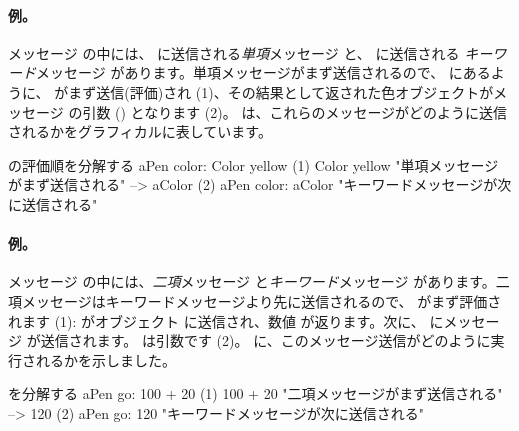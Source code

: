 \documentclass[a4paper,10pt,twoside]{book}
\begin{document}


\paragraph{例。}
メッセージ  の中には、 に送信される\emph{単項}メッセージ と、 に送信される \emph{キーワード}メッセージ  があります。単項メッセージがまず送信されるので、 にあるように、 がまず送信(評価)され (1)、その結果として返された色オブジェクトがメッセージ  の引数 () となります (2)。
 は、これらのメッセージがどのように送信されるかをグラフィカルに表しています。

\begin{example}[decColor]{ の評価順を分解する}{}
        aPen color: Color yellow
(1)                       Color yellow        "単項メッセージがまず送信される"
                        --> aColor
(2)   aPen color: aColor                 "キーワードメッセージが次に送信される"
\end{example}

\paragraph{例。} メッセージ  の中には、\emph{二項}メッセージ  と\emph{キーワード}メッセージ  があります。二項メッセージはキーワードメッセージより先に送信されるので、 がまず評価されます (1):  がオブジェクト  に送信され、数値  が返ります。次に、 にメッセージ  が送信されます。 は引数です (2)。
に、このメッセージ送信がどのように実行されるかを示しました。

\begin{example}[decGo]{ を分解する}{}
      aPen go: 100 + 20   
(1)                 100 + 20           "二項メッセージがまず送信される"
                   -->   120
(2)  aPen go: 120                   "キーワードメッセージが次に送信される"
\end{example}
\end{document}
